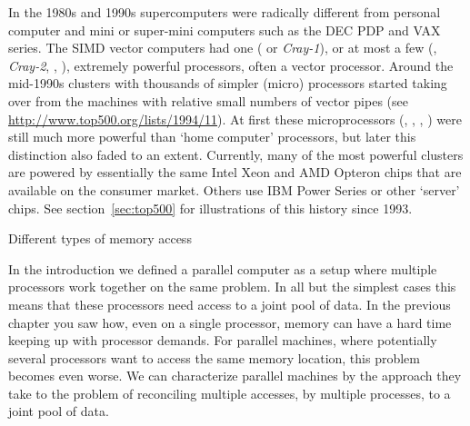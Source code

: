 In the 1980s and 1990s supercomputers were radically different from
personal computer and mini or super-mini computers such as the DEC PDP
and VAX series. The SIMD vector computers had one
( or \emph{Cray-1}), or
at most a few (, \emph{Cray-2},
, ), extremely
powerful processors, often a vector processor. Around the mid-1990s
clusters with thousands of simpler (micro) processors started taking
over from the machines with relative small numbers of vector pipes
(see \url{http://www.top500.org/lists/1994/11}). At first these
microprocessors (,
, ,
) were still much more powerful than `home
computer' processors, but later this distinction also faded to an
extent. Currently, many of the most powerful clusters are powered by
essentially the same Intel Xeon and AMD Opteron chips that are
available on the consumer market. Others use IBM Power Series or other
`server' chips. See section~\ref{sec:top500} for illustrations of
this history since 1993.

 {Different types of memory access}

In the introduction we defined a parallel computer as a setup where
multiple processors work together on the same problem. In all but the
simplest cases this means that these processors need access to a joint
pool of data. In the previous chapter you saw how, even on a single
processor, memory can have a hard time keeping up with processor demands.
For parallel machines, where potentially several processors
want to access the same memory location, this problem becomes even
worse. We can characterize parallel machines by the approach they take
to the problem of reconciling multiple accesses, by multiple
processes, to a joint pool of data.

